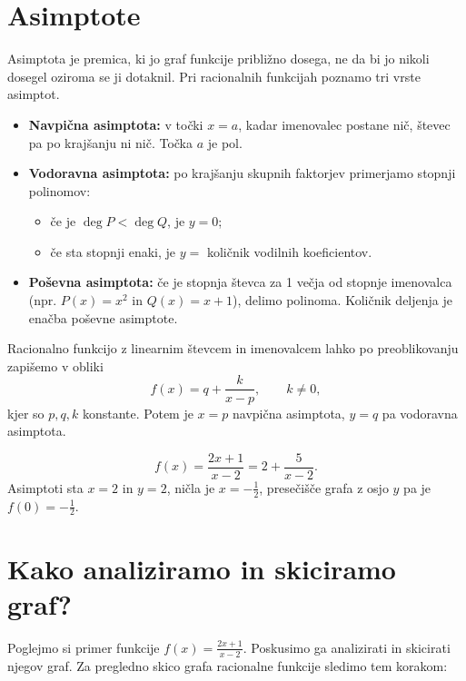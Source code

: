 \documentclass[11pt]{article}
\begin{document}
\section{Asimptote}

Asimptota je premica, ki jo graf funkcije približno dosega, ne da bi jo nikoli dosegel oziroma se ji dotaknil. Pri racionalnih funkcijah poznamo tri vrste asimptot.

\begin{itemize}[leftmargin=*]
  \item \textbf{Navpična asimptota:} v točki $x=a$, kadar imenovalec postane nič, števec pa po krajšanju ni nič. Točka $a$ je pol.
  \item \textbf{Vodoravna asimptota:} po krajšanju skupnih faktorjev primerjamo stopnji polinomov:
    \begin{itemize}
      \item če je $\deg P<\deg Q$, je $y=0$;
      \item če sta stopnji enaki, je $y=$ količnik vodilnih koeficientov.
    \end{itemize}
  \item \textbf{Poševna asimptota:} če je stopnja števca za 1 večja od stopnje imenovalca (npr. $P(x)=x^2$ in $Q(x)=x+1$), delimo polinoma. Količnik deljenja je enačba poševne asimptote.
\end{itemize}

Racionalno funkcijo z linearnim števcem in imenovalcem lahko po preoblikovanju zapišemo v obliki
\[
 f(x)=q+\frac{k}{x-p},\qquad k\ne 0,
\]
kjer so $p,q,k$ konstante. Potem je $x=p$ navpična asimptota, $y=q$ pa vodoravna asimptota.

\vspace{0.3cm}
\begin{zgledbox}
\[
 f(x)=\frac{2x+1}{x-2}=2+\frac{5}{x-2}.
\]
Asimptoti sta $x=2$ in $y=2$, ničla je $x=-\frac{1}{2}$, presečišče grafa z osjo $y$ pa je $f(0)=-\frac{1}{2}$.
\end{zgledbox}

\section{Kako analiziramo in skiciramo graf?}

Poglejmo si primer funkcije $f(x)=\frac{2x+1}{x-2}$. Poskusimo ga analizirati in skicirati njegov graf. Za pregledno skico grafa racionalne funkcije sledimo tem korakom:
\end{document}
